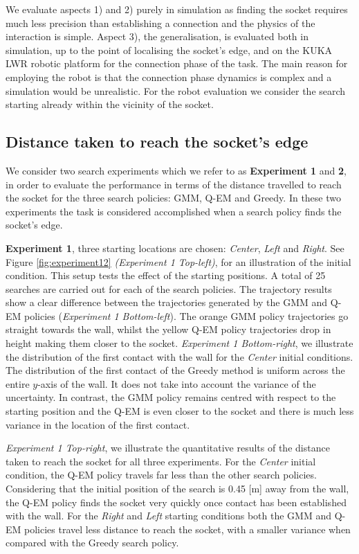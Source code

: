 \documentclass[final,3p,times,twocolumn]{elsarticle}
\begin{document}
We evaluate aspects 1) and 2) purely in simulation as finding the socket requires much less precision than establishing a 
connection and the physics of the interaction is simple. Aspect 3), the generalisation, is evaluated both in simulation,
up to the point of localising the socket's edge, and on the KUKA LWR robotic platform
for the connection phase of the task. The main reason for employing the robot is that the connection phase dynamics is 
complex and a simulation would be unrealistic. For the robot evaluation we consider 
the search starting already within the vicinity of the socket.

\subsection{Distance taken to reach the socket's edge}

We consider two search experiments which we refer to as \textbf{Experiment 1} and \textbf{2}, in order to evaluate the performance 
in terms of the distance travelled to reach the socket for the three search policies: GMM, Q-EM and Greedy. In these two 
experiments the task is considered accomplished when a search policy finds the socket's edge. 

\textbf{Experiment 1}, three starting locations are chosen: \textit{Center}, \textit{Left} and \textit{Right}. 
See Figure \ref{fig:experiment12} \textit{(Experiment 1 Top-left)}, for an illustration of the initial condition. 
This setup tests the effect of the starting positions. A total of 25 searches are carried out for each of the search policies.
The trajectory results show a clear difference between the trajectories generated by the GMM and Q-EM policies (\textit{Experiment 1 Bottom-left}). 
The orange GMM policy trajectories go straight towards the wall, whilst the yellow Q-EM policy trajectories drop in height 
making them closer to the socket. 
\textit{Experiment 1 Bottom-right}, we illustrate the distribution of the first contact with the wall for the \textit{Center} initial 
conditions. The distribution of the first contact of the Greedy method is uniform across the entire $y$-axis of the wall. 
It does not take into account the variance of the uncertainty. In contrast, the GMM policy remains centred 
with respect to the starting position and the Q-EM is even closer to the socket and there is much less variance in 
the location of the first contact.

\textit{Experiment 1 Top-right}, we illustrate the quantitative results of the distance taken to reach the socket for 
all three experiments. For the \textit{Center} initial condition, the Q-EM policy travels far less than the other search policies. 
Considering that the initial position of the search is 0.45 [m] away from the wall, the Q-EM policy finds the socket very 
quickly once contact has been established with the wall. For the \textit{Right} and \textit{Left} starting conditions both 
the GMM and Q-EM policies travel less distance to reach the socket, with a smaller variance when compared with the Greedy search policy.
\end{document}
